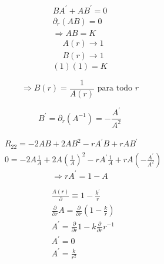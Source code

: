 \begin{equation}
    \begin{gathered}
        B A^{\prime}+A B^{\prime}=0 \\
        \partial_r(A B)=0 \\
        \Rightarrow A B=K
    \end{gathered}
\end{equation}
\begin{equation}
    \begin{aligned}
         & A(r) \rightarrow 1 \\
         & B(r) \rightarrow 1
    \end{aligned}
\end{equation}
\begin{equation}
    (1)(1)=K
\end{equation}

\begin{equation}
    \Rightarrow B(r)=\frac{1}{A(r)} \text { para todo } r
\end{equation}

\begin{equation}
    B^{\prime}=\partial_r\left(A^{-1}\right)=-\frac{A^{\prime}}{A^2}
\end{equation}


\begin{equation}
    \begin{aligned}
         & R_{22}=-2 A B+2 A B^2-r A^{\prime} B+r A B^{\prime}                                                               \\
         & 0=-2 A \frac{1}{A}+2 A\left(\frac{1}{A}\right)^2-r A^{\prime} \frac{1}{A}+r A\left(-\frac{A^{\prime}}{A^2}\right)
    \end{aligned}
\end{equation}
\begin{equation}
    \Rightarrow r A^{\prime}=1-A
\end{equation}

\begin{equation}
    \begin{aligned}
         & \frac{A(r)}{\partial} \equiv 1-\frac{k^{\prime}}{r}                                 \\
         & \frac{\partial}{\partial r} A=\frac{\partial}{\partial r}\left(1-\frac{k}{r}\right) \\
         & A^{\prime}=\frac{\partial}{\partial r} 1-k \frac{\partial}{\partial r} r^{-1}       \\
         & A^{\prime}=0                                                                        \\
         & A^{\prime}=\frac{k}{r^2}
    \end{aligned}
\end{equation}

